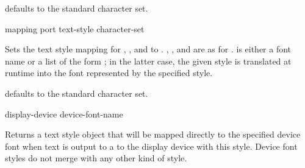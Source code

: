  defaults to the standard character set.

 {mapping port text-style \optional character-set} 

Sets the text style mapping for , , and
 to .  , , and
 are as for .   is either a
font name or a list of the form ; in the latter case, the given style is translated at runtime into
the font represented by the specified style.

 defaults to the standard character set.

 {display-device device-font-name}

Returns a text style object that will be mapped directly to the specified device
font when text is output to a to the display device with this style.  Device
font styles do not merge with any other kind of style.
